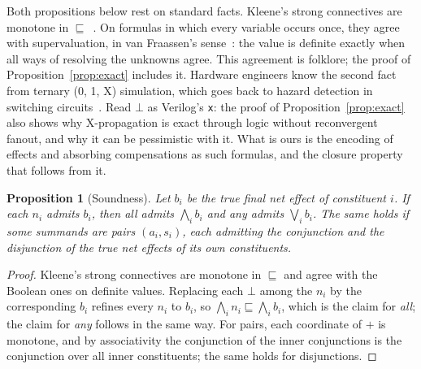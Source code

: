 \documentclass[11pt]{article}
\theoremstyle{definition}
\theoremstyle{plain}
\newtheorem{proposition}{Proposition}
\newcommand{\mayb}{\bot}
\begin{document}
Both propositions below rest on standard facts. Kleene's strong connectives are monotone in $\sqsubseteq$~\citep{Kleene1952}. On formulas in which every variable occurs once, they agree with supervaluation, in van Fraassen's sense~\citep{vanFraassen1966}: the value is definite exactly when all ways of resolving the unknowns agree. This agreement is folklore; the proof of Proposition~\ref{prop:exact} includes it. Hardware engineers know the second fact from ternary (0, 1, X) simulation, which goes back to hazard detection in switching circuits~\citep{Eichelberger1965}. Read $\mayb$ as Verilog's \texttt{x}: the proof of Proposition~\ref{prop:exact} also shows why X-propagation is exact through logic without reconvergent fanout, and why it can be pessimistic with it. What is ours is the encoding of effects and absorbing compensations as such formulas, and the closure property that follows from it.

\begin{proposition}[Soundness]
\label{prop:sound}
Let $b_i$ be the true final net effect of constituent $i$. If each $n_i$ admits $b_i$, then \emph{all} admits $\bigwedge_i b_i$ and \emph{any} admits $\bigvee_i b_i$. The same holds if some summands are pairs $(a_i,s_i)$, each admitting the conjunction and the disjunction of the true net effects of its own constituents.
\end{proposition}
\begin{proof}
Kleene's strong connectives are monotone in $\sqsubseteq$ and agree with the Boolean ones on definite values. Replacing each $\mayb$ among the $n_i$ by the corresponding $b_i$ refines every $n_i$ to $b_i$, so $\bigwedge_i n_i \sqsubseteq \bigwedge_i b_i$, which is the claim for \emph{all}; the claim for \emph{any} follows in the same way. For pairs, each coordinate of $+$ is monotone, and by associativity the conjunction of the inner conjunctions is the conjunction over all inner constituents; the same holds for disjunctions.
\end{proof}
\end{document}
